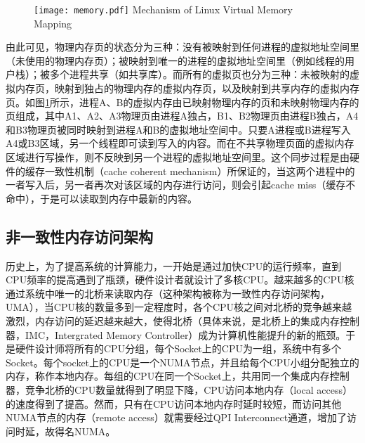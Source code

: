 \begin{figure}[!htp]
  \centering
  \texttt{[image: memory.pdf]}
    {Mechanism of Linux Virtual Memory Mapping}
  \label{fig:MEM}
\end{figure}

由此可见，物理内存页的状态分为三种：没有被映射到任何进程的虚拟地址空间里（未使用的物理内存页）；被映射到唯一的进程的虚拟地址空间里（例如线程的用户栈）；被多个进程共享（如共享库）。而所有的虚拟页也分为三种：未被映射的虚拟内存页，映射到独占的物理内存的虚拟内存页，以及映射到共享内存的虚拟内存页。如图\ref{fig:MEM}所示，进程A、B的虚拟内存由已映射物理内存的页和未映射物理内存的页组成，其中A1、A2、A3物理页由进程A独占，B1、B2物理页由进程B独占，A4和B3物理页被同时映射到进程A和B的虚拟地址空间中。只要A进程或B进程写入A4或B3区域，另一个线程即可读到写入的内容。而在不共享物理页面的虚拟内存区域进行写操作，则不反映到另一个进程的虚拟地址空间里。这个同步过程是由硬件的缓存一致性机制（cache coherent mechanism）所保证的，当这两个进程中的一者写入后，另一者再次对该区域的内存进行访问，则会引起cache miss（缓存不命中），于是可以读取到内存中最新的内容。

\subsection{非一致性内存访问架构}
历史上，为了提高系统的计算能力，一开始是通过加快CPU的运行频率，直到CPU频率的提高遇到了瓶颈，硬件设计者就设计了多核CPU。越来越多的CPU核通过系统中唯一的北桥来读取内存（这种架构被称为一致性内存访问架构，UMA），当CPU核的数量多到一定程度时，各个CPU核之间对北桥的竞争越来越激烈，内存访问的延迟越来越大，使得北桥（具体来说，是北桥上的集成内存控制器，IMC，Intergrated Memory Controller）成为计算机性能提升的新的瓶颈。于是硬件设计师将所有的CPU分组，每个Socket上的CPU为一组，系统中有多个Socket。每个socket上的CPU是一个NUMA节点，并且给每个CPU小组分配独立的内存，称作本地内存。每组的CPU在同一个Socket上，共用同一个集成内存控制器，竞争北桥的CPU数量就得到了明显下降，CPU访问本地内存（local access）的速度得到了提高。然而，只有在CPU访问本地内存时延时较短，而访问其他NUMA节点的内存（remote access）就需要经过QPI Interconnect通道，增加了访问时延，故得名NUMA。
\label{chap:memm}

